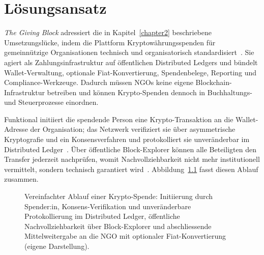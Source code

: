 \chapter{Lösungsansatz}
\label{chapter3}

\emph{The Giving Block} adressiert die in Kapitel~\ref{chapter2} beschriebene Umsetzungslücke, indem die Plattform Kryptowährungsspenden für gemeinnützige Organisationen technisch und organisatorisch standardisiert~\cite{givingblock}. Sie agiert als Zahlungsinfrastruktur auf öffentlichen Distributed Ledgers und bündelt Wallet-Verwaltung, optionale Fiat-Konvertierung, Spendenbelege, Reporting und Compliance-Werkzeuge. Dadurch müssen NGOs keine eigene Blockchain-Infrastruktur betreiben und können Krypto-Spenden dennoch in Buchhaltungs- und Steuerprozesse einordnen.

Funktional initiiert die spendende Person eine Krypto-Transaktion an die Wallet-Adresse der Organisation; das Netzwerk verifiziert sie über asymmetrische Kryptografie und ein Konsensverfahren und protokolliert sie unveränderbar im Distributed Ledger~\cite{nakamoto2008, MeierStormer2018}. Über öffentliche Block-Explorer können alle Beteiligten den Transfer jederzeit nachprüfen, womit Nachvollziehbarkeit nicht mehr institutionell vermittelt, sondern technisch garantiert wird~\cite{Teng2021}. Abbildung~\ref{fig:spendenfluss} fasst diesen Ablauf zusammen.

\begin{figure}[h]
    \centering
    \caption[Spendenfluss über The Giving Block]{Vereinfachter Ablauf einer Krypto-Spende: Initiierung durch Spender:in, Konsens-Verifikation und unveränderbare Protokollierung im Distributed Ledger, öffentliche Nachvollziehbarkeit über Block-Explorer und abschliessende Mittelweitergabe an die NGO mit optionaler Fiat-Konvertierung (eigene Darstellung).}
    \label{fig:spendenfluss}
\end{figure}

